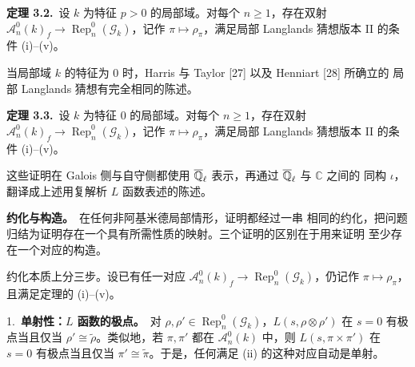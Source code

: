 \par\medskip\noindent\textbf{定理 3.2.}\ 设 $k$ 为特征 $p>0$ 的局部域。对每个
$n\ge1$，存在双射
$\mathcal{A}_n^0(k)_f\to\operatorname{Rep}_n^0(\mathcal{G}_k)$，记作
$\pi\mapsto\rho_\pi$，满足局部 Langlands 猜想版本 II 的条件 (i)--(v)。
\par\medskip

当局部域 $k$ 的特征为 $0$ 时，Harris 与 Taylor [27] 以及 Henniart [28] 所确立的
局部 Langlands 猜想有完全相同的陈述。

\par\medskip\noindent\textbf{定理 3.3.}\ 设 $k$ 为特征 $0$ 的局部域。对每个
$n\ge1$，存在双射
$\mathcal{A}_n^0(k)_f\to\operatorname{Rep}_n^0(\mathcal{G}_k)$，记作
$\pi\mapsto\rho_\pi$，满足局部 Langlands 猜想版本 II 的条件 (i)--(v)。
\par\medskip

这些证明在 Galois 侧与自守侧都使用 $\overline{\mathbb{Q}}_\ell$ 表示，再通过 $\overline{\mathbb{Q}}_\ell$ 与 $\mathbb{C}$ 之间的
同构 $\iota$，翻译成上述用复解析 $L$ 函数表述的陈述。

\par\medskip\noindent\textbf{约化与构造。}\ 在任何非阿基米德局部情形，证明都经过一串
相同的约化，把问题归结为证明存在一个具有所需性质的映射。三个证明的区别在于用来证明
至少存在一个对应的构造。

约化本质上分三步。设已有任一对应
$\mathcal{A}_n^0(k)_f\to\operatorname{Rep}_n^0(\mathcal{G}_k)$，仍记作
$\pi\mapsto\rho_\pi$，且满足定理的 (i)--(v)。

1.~\textbf{单射性：$L$ 函数的极点。}\ 对
$\rho,\rho'\in\operatorname{Rep}_n^0(\mathcal{G}_k)$，$L(s,\rho\otimes\rho')$
在 $s=0$ 有极点当且仅当 $\rho'\cong\tilde\rho$。类似地，若 $\pi,\pi'$ 都在
$\mathcal{A}_n^0(k)$ 中，则 $L(s,\pi\times\pi')$ 在 $s=0$ 有极点当且仅当
$\pi'\cong\tilde\pi$。于是，任何满足 (ii) 的这种对应自动是单射。

